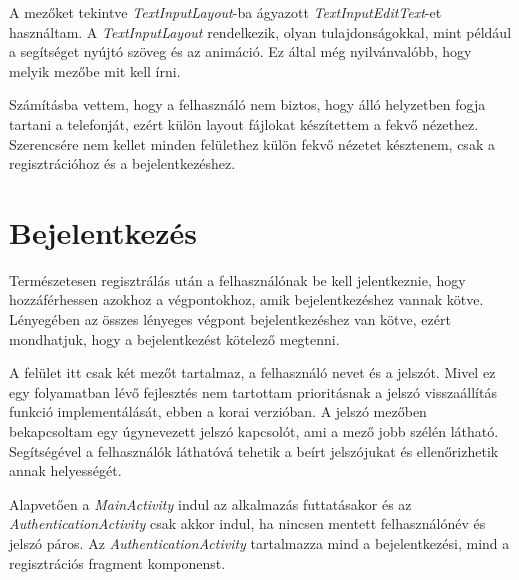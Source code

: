 \documentclass{thesis-ekf}
\theoremstyle{definition}
\theoremstyle{remark}
\begin{document}
A mezőket tekintve \emph{TextInputLayout}-ba ágyazott \emph{TextInputEditText}-et használtam.
A \emph{TextInputLayout} rendelkezik, olyan tulajdonságokkal, mint például a segítséget nyújtó szöveg és az animáció.
Ez által még nyilvánvalóbb, hogy melyik mezőbe mit kell írni.

Számításba vettem, hogy a felhasználó nem biztos, hogy álló helyzetben fogja tartani a telefonját, ezért külön layout fájlokat készítettem a fekvő nézethez.
Szerencsére nem kellet minden felülethez külön fekvő nézetet késztenem, csak a regisztrációhoz és a bejelentkezéshez.

\section{Bejelentkezés}

Természetesen regisztrálás után a felhasználónak be kell jelentkeznie, hogy hozzáférhessen azokhoz a végpontokhoz, amik bejelentkezéshez vannak kötve.
Lényegében az összes lényeges végpont bejelentkezéshez van kötve, ezért mondhatjuk, hogy a bejelentkezést kötelező megtenni.

A felület itt csak két mezőt tartalmaz, a felhasználó nevet és a jelszót.
Mivel ez egy folyamatban lévő fejlesztés nem tartottam prioritásnak a jelszó visszaállítás funkció implementálását, ebben a korai verzióban.
A jelszó mezőben bekapcsoltam egy úgynevezett jelszó kapcsolót, ami a mező jobb szélén látható.
Segítségével a felhasználók láthatóvá tehetik a beírt jelszójukat és ellenőrizhetik annak helyességét.

Alapvetően a \emph{MainActivity} indul az alkalmazás futtatásakor és az \emph{AuthenticationActivity} csak akkor indul, ha nincsen mentett felhasználónév és jelszó páros.
Az \emph{AuthenticationActivity} tartalmazza mind a bejelentkezési, mind a regisztrációs fragment komponenst.
\end{document}
